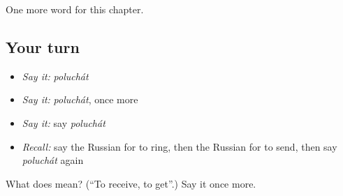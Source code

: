 \begin{grammarlens}[title={What you've built}]
One more word for this chapter.
\end{grammarlens}

\subsection*{Your turn}
\begin{itemize}
\raggedright
  \item \emph{Say it:} \emph{poluchát}
  \item \emph{Say it:} \emph{poluchát}, once more
  \item \emph{Say it:} say \emph{poluchát}
  \item \emph{Recall:} say the Russian for to ring, then the Russian for to send, then say \emph{poluchát} again
\end{itemize}

\begin{tcolorbox}[breakable,colback=teal!4,colframe=teal!35!black,title={Before you move on}]
What does  mean? (\textquotedblleft{}To receive, to get\textquotedblright{}.) Say it once more.
\end{tcolorbox}
